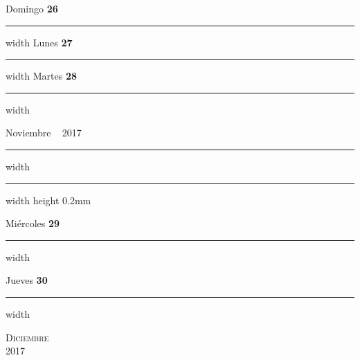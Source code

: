 \documentclass[portrait]{article}
\newcommand\blankpage{%
\null 
\thispagestyle{empty}%
\addtocounter{page}{-1}%
\newpage}
\begin{document}
\hfill \break \hfill \break 
{\Large Domingo} {\LARGE\color{Dandelion} \textbf{26}}  \hfill \break\hrule width \hsize \kern 2pt\hfill \break \hfill \break \hfill \break \hfill \break \hfill \break \break 
\hfill \break \hfill \break 
{\Large Lunes} {\LARGE\color{Dandelion} \textbf{27}}  \hfill \break\hrule width \hsize \kern 2pt\hfill \break \hfill \break \hfill \break \hfill \break \hfill \break \break 
\hfill \break \hfill \break 
{\Large Martes} {\LARGE\color{Dandelion} \textbf{28}}  \hfill \break\hrule width \hsize \kern 2pt\hfill \break \hfill \break \hfill \break \hfill \break \hfill \break \break 
\newpage {} \begin{flushright}{\Huge Noviembre} ~ {\color{Dandelion} \large 2017} \end{flushright} 
\hrule depth 0.3mm width \hsize \kern 1pt \hrule width \hsize height 0.2mm 
\hfill \break 
 \begin{flushright}{\Large Mi\'ercoles} {\LARGE\color{Dandelion} \textbf{29}}\end{flushright}\hrule width \hsize \kern 2pt\hfill \break \hfill \break \hfill \break \hfill \break \hfill \break \break
\hfill \break 
 \begin{flushright}{\Large Jueves} {\LARGE\color{Dandelion} \textbf{30}}\end{flushright}\hrule width \hsize \kern 2pt\hfill \break \hfill \break \hfill \break \hfill \break \hfill \break \break
\afterpage{\blankpage}\newpage {}\pagestyle{empty} %
\noindent 
{} %
\begin{center} 
\textsc{\Huge \color{Dandelion}Diciembre}\\ %
\textsc{\large 2017} %
\end{center} 
\end{document}
